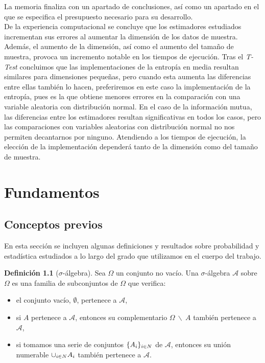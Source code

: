 \documentclass[12pt,a4paper]{report} %
\let\mathbb\relax
\theoremstyle{definition}
\newtheorem{definition}{Definición}[section]
\begin{document}
La memoria finaliza con un apartado de conclusiones, así como un apartado en el que se especifica el presupuesto necesario para su desarrollo.\\

De la experiencia computacional se concluye que los estimadores estudiados incrementan sus errores al aumentar la dimensión de los datos de muestra. Además, el aumento de la dimensión, así como el aumento del tamaño de muestra, provoca un incremento notable en los tiempos de ejecución. Tras el \textit{T-Test} concluimos que las implementaciones de la entropía en media resultan similares para dimensiones pequeñas, pero cuando esta aumenta las diferencias entre ellas también lo hacen, preferiremos en este caso la implementación \cite{estimating} de la entropía, pues es la que obtiene menores errores en la comparación con una variable aleatoria con distribución normal. En el caso de la información mutua, las diferencias entre los estimadores resultan significativas en todos los casos, pero las comparaciones con variables aleatorias con distribución normal no nos permiten decantarnos por ninguno. Atendiendo a los tiempos de ejecución, la elección de la implementación dependerá tanto de la dimensión como del tamaño de muestra.\\


\chapter{Fundamentos}

\section{Conceptos previos}

En esta sección se incluyen algunas definiciones y resultados sobre probabilidad y estadística estudiados a lo largo del grado que utilizamos en el cuerpo del trabajo.\\

\begin{definition}[$\sigma$-álgebra]
  Sea $\Omega$ un conjunto no vacío. Una $\sigma$-álgebra $\mathcal{A}$ sobre $\Omega$ es una familia de subconjuntos de $\Omega$ que verifica:
  \begin{itemize}
  \item  el conjunto vacío, $\emptyset$, pertenece a $\mathcal{A}$,
  \item  si $A$ pertenece a $\mathcal{A}$, entonces su complementario $\Omega\ \backslash\ A$ también pertenece a $\mathcal{A}$,
 \item si tomamos una serie de conjuntos $\{A_i\}_{i\in \mathbb{N}}$ de $\mathcal{A}$, entonces su unión numerable $\cup_{i\in \mathbb{N}}A_i$ también pertenece a $\mathcal{A}$.\\
  \end{itemize}
  
\end{definition}
\end{document}
